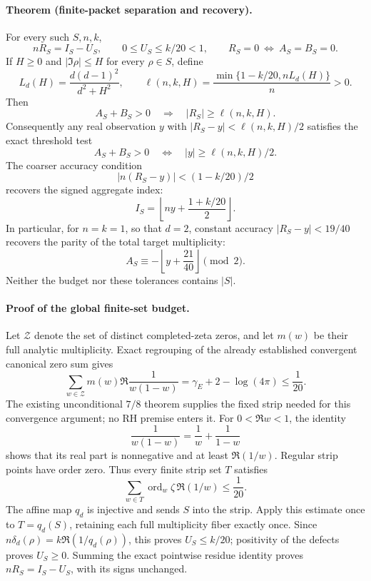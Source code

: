 \paragraph{Theorem (finite-packet separation and recovery).}
For every such \(S,n,k\),
\begin{equation}\label{eq:finite-real-packet-budget}
 nR_S=I_S-U_S,\qquad 0\le U_S\le k/20<1,\qquad
 R_S=0\ \Longleftrightarrow\ A_S=B_S=0.
\end{equation}
If \(H\ge0\) and \(|\Im\rho|\le H\) for every \(\rho\in S\), define
\[
 L_d(H)=\frac{d(d-1)^2}{d^2+H^2},\qquad
 \ell(n,k,H)=\frac{\min\{1-k/20,nL_d(H)\}}{n}>0.
\]
Then
\[
 A_S+B_S>0\quad\Longrightarrow\quad |R_S|\ge\ell(n,k,H).
\]
Consequently any real observation \(y\) with
\(|R_S-y|<\ell(n,k,H)/2\) satisfies the exact threshold test
\[
 A_S+B_S>0\quad\Longleftrightarrow\quad |y|\ge\ell(n,k,H)/2.
\]
The coarser accuracy condition
\[
 |n(R_S-y)|<(1-k/20)/2
\]
recovers the signed aggregate index:
\[
 I_S=\left\lfloor ny+\frac{1+k/20}{2}\right\rfloor.
\]
In particular, for \(n=k=1\), so that \(d=2\), constant accuracy
\(|R_S-y|<19/40\) recovers the parity of the total target multiplicity:
\[
 A_S\equiv-\left\lfloor y+\frac{21}{40}\right\rfloor\pmod2.
\]
Neither the budget nor these tolerances contains \(|S|\).

\paragraph{Proof of the global finite-set budget.}
Let \(\mathcal Z\) denote the set of distinct completed-zeta zeros, and
let \(m(w)\) be their full analytic multiplicity. Exact regrouping of the
already established convergent canonical zero sum gives
\[
 \sum_{w\in\mathcal Z}m(w)\Re\frac1{w(1-w)}
   =\gamma_E+2-\log(4\pi)\le\frac1{20}.
\]
The existing unconditional \(7/8\) theorem supplies the fixed strip
needed for this convergence argument; no RH premise enters it.
For \(0<\Re w<1\), the identity
\[
 \frac1{w(1-w)}=\frac1w+\frac1{1-w}
\]
shows that its real part is nonnegative and at least \(\Re(1/w)\).
Regular strip points have order zero. Thus every finite strip set \(T\)
satisfies
\[
 \sum_{w\in T}\operatorname{ord}_w\zeta\,\Re(1/w)\le\frac1{20}.
\]
The affine map \(q_d\) is injective and sends \(S\) into the strip.
Apply this estimate once to \(T=q_d(S)\), retaining each full
multiplicity fiber exactly once. Since \(n\delta_d(\rho)=k\Re(1/q_d(\rho))\),
this proves \(U_S\le k/20\); positivity of the defects proves \(U_S\ge0\).
Summing the exact pointwise residue identity proves
\(nR_S=I_S-U_S\), with its signs unchanged.

